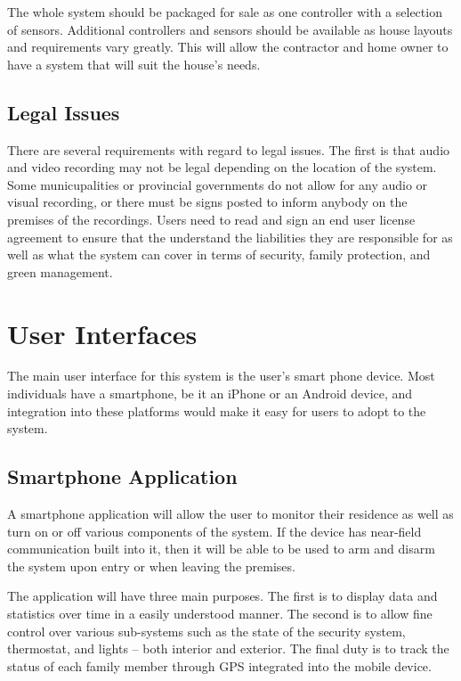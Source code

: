 \documentclass{report}
\begin{document}
The whole system should be packaged for sale as one controller with a selection
of sensors. Additional controllers and sensors should be available as house
layouts and requirements vary greatly. This will allow the contractor and home
owner to have a system that will suit the house's needs.

\section{Legal Issues}
There are several requirements with regard to legal issues. The first is that
audio and video recording may not be legal depending on the location of the
system. Some municupalities or provincial governments do not allow for any
audio or visual recording, or there must be signs posted to inform anybody on
the premises of the recordings. Users need to read and sign an end user
license agreement to ensure that the understand the liabilities they are
responsible for as well as what the system can cover in terms of security,
family protection, and green management.


\chapter{User Interfaces}
\label{ch:user-interfaces}
The main user interface for this system is the user's smart phone device. Most
individuals have a smartphone, be it an iPhone or an Android device, and
integration into these platforms would make it easy for users to adopt to the
system.

\section{Smartphone Application}
\label{sec:mobile-app}
A smartphone application will allow the user to monitor their residence as well
as turn on or off various components of the system. If the device has
near-field communication built into it, then it will be able to be used to
arm and disarm the system upon entry or when leaving the premises. 

The application will have three main purposes. The first is to display data and
statistics over time in a easily understood manner. The second is to allow fine
control over various sub-systems such as the state of the security system,
thermostat, and lights -- both interior and exterior. The final duty is to
track the status of each family member through GPS integrated into the mobile
device. 
\end{document}

